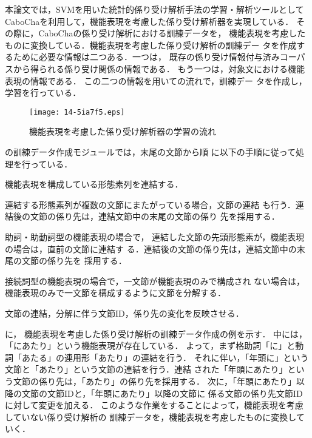 \documentclass[japanese]{jnlp_1.3e}
\begin{document}
本論文では，SVMを用いた統計的係り受け解析手法の学習・解析ツールとして
CaboChaを利用して，機能表現を考慮した係り受け解析器を実現している．
その際に，CaboChaの係り受け解析における訓練データを，
機能表現を考慮したものに変換している．機能表現を考慮した係り受け解析の訓練デー
タを作成するために必要な情報は二つある．一つは，
既存の係り受け情報付与済みコーパスから得られる係り受け関係の情報である．
もう一つは，対象文における機能表現の情報である．
この二つの情報を用いての流れで，訓練デー
タを作成し，学習を行っている．

\begin{figure}[t]
\begin{center}
\texttt{[image: 14-5ia7f5.eps]}
\end{center}
 \caption{機能表現を考慮した係り受け解析器の学習の流れ}
 \label{fig:学習の流れ}
\end{figure}


の訓練データ作成モジュールでは，末尾の文節から順
に以下の手順に従って処理を行っている．
\begin{description}
 \label{アルゴリズム}
 \item[1.] 機能表現を構成している形態素列を連結する．
 \item[2.] 連結する形態素列が複数の文節にまたがっている場合，文節の連結
	    も行う．連結後の文節の係り先は，連結文節中の末尾の文節の係り
	    先を採用する．
 \item[3a.] 助詞・助動詞型の機能表現の場合で，
	    連結した文節の先頭形態素が，機能表現の場合は，直前の文節に連結す
	    る．連結後の文節の係り先は，連結文節中の末尾の文節の係り先を
	    採用する．
 \item[3b.] 接続詞型の機能表現の場合で，一文節が機能表現のみで構成され
	    ない場合は，
	    機能表現のみで一文節を構成するように文節を分解する．
 \item[4.] 文節の連結，分解に伴う文節ID，係り先の変化を反映させる．
\end{description}
に，
機能表現を考慮した係り受け解析の訓練データ作成の例を示す．
中には，「にあたり」という機能表現が存在している．
よって，まず格助詞「に」と動詞「あたる」の連用形「あたり」の連結を行う．
それに伴い，「年頭に」という文節と「あたり」という文節の連結を行う．連結
された「年頭にあたり」という文節の係り先は，「あたり」の係り先を採用する．
次に，「年頭にあたり」以降の文節の文節IDと，「年頭にあたり」以降の文節に
係る文節の係り先文節IDに対して変更を加える．
このような作業をすることによって，機能表現を考慮していない係り受け解析の
訓練データを，機能表現を考慮したものに変換していく．
\end{document}
